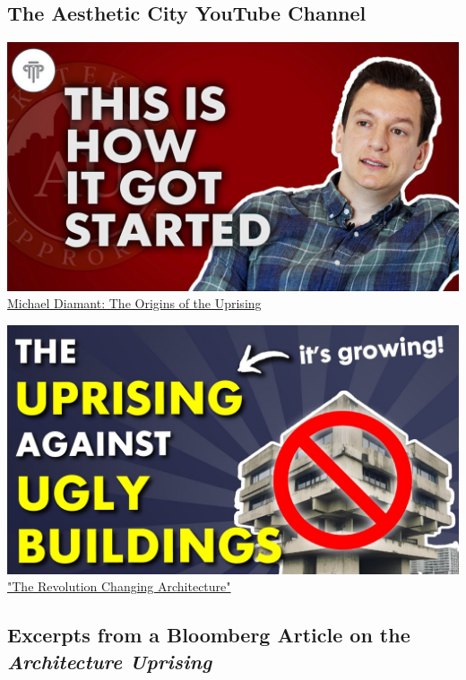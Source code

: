 \documentclass[a4paper]{article}
\begin{document}
\subsection{The Aesthetic City YouTube Channel}

\noindent
\begin{minipage}[t]{0.49\linewidth}
    \centering
    \includegraphics[width=\linewidth]{./figures/thumbnail_interview.jpg}
    \href{https://youtu.be/a9uLNxyKgCE?si=srT0AzgzI3LR4ccr}{Michael Diamant: The Origins of the Uprising}
\end{minipage}%
\hfill
\begin{minipage}[t]{0.49\linewidth}
    \centering
    \includegraphics[width=\linewidth]{./figures/thumbnail_uprising.jpg}
    \href{https://youtu.be/NTGQ_kITzmY?si=yEBpKZUstUKUUOqp}{"The Revolution Changing Architecture"}
\end{minipage}

\subsection{Excerpts from a Bloomberg Article \cite{gersten_nordic_2023} on the \textit{Architecture Uprising}}
\end{document}
